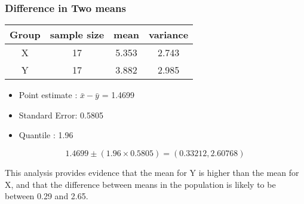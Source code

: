 \begin{frame}
\frametitle{Difference in Two means}
\begin{center}
\begin{tabular}{|c|c|c|c|}
\hline
Group & sample size & mean & variance \\ \hline
X & 17 & 5.353 & 2.743 \\ \hline
Y & 17 & 3.882 & 2.985 \\ \hline
\end{tabular}
\end{center}
\end{frame}
\begin{frame}
\begin{itemize}
\item Point estimate : $\bar{x} - \bar{y}$ = 1.4699
\item Standard Error: 0.5805
\item Quantile : 1.96
\end{itemize}

\[ 1.4699  \pm (1.96 \times 0.5805) = (0.33212,2.60768) \]


This analysis provides evidence that the mean for Y is higher than the mean for X, 
and that the difference between means in the population is likely to be between 0.29 and 2.65.


\end{frame}


